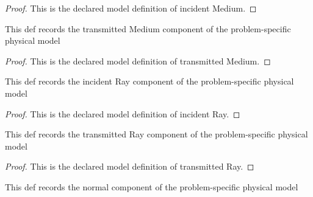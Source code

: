 \begin{proof}
  This is the declared model definition of incident Medium.
\end{proof}
\begin{definition}
  \label{def:physics:phyx-mini-0000:phyxminiproblems-problemphyxmini0000-refractioninterface-transmittedmedium}
  This def records the transmitted Medium component of the problem-specific physical model
\end{definition}
\begin{proof}
  This is the declared model definition of transmitted Medium.
\end{proof}
\begin{definition}
  \label{def:physics:phyx-mini-0000:phyxminiproblems-problemphyxmini0000-refractioninterface-incidentray}
  This def records the incident Ray component of the problem-specific physical model
\end{definition}
\begin{proof}
  This is the declared model definition of incident Ray.
\end{proof}
\begin{definition}
  \label{def:physics:phyx-mini-0000:phyxminiproblems-problemphyxmini0000-refractioninterface-transmittedray}
  This def records the transmitted Ray component of the problem-specific physical model
\end{definition}
\begin{proof}
  This is the declared model definition of transmitted Ray.
\end{proof}
\begin{definition}[normal]
  \label{def:physics:phyx-mini-0000:phyxminiproblems-problemphyxmini0000-refractioninterface-normal}
  This def records the normal component of the problem-specific physical model
\end{definition}
